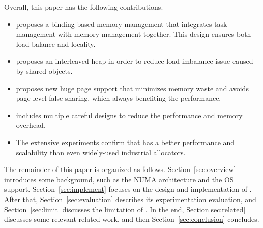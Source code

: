 Overall, this paper has the following contributions. 

\begin{itemize}
\item \NM{} proposes a binding-based memory management that integrates task management with memory management together. This design ensures both load balance and locality.  
\item \NM{} proposes an interleaved heap in order to reduce load imbalance issue caused by shared objects. 
\item \NM{} proposes new huge page support that  minimizes memory waste and avoids page-level false sharing, which always benefiting the performance. 
\item \NM{} includes multiple careful designs to reduce the performance and memory overhead. 
\item The extensive experiments confirm that \NM{} has a better performance and scalability than even widely-used industrial allocators. 
\end{itemize}

The remainder of this paper is organized as follows. Section~\ref{sec:overview} introduces some background, such as the NUMA architecture and the OS support. Section~\ref{sec:implement} focuses on the design and implementation of \NM{}. After that, Section~\ref{sec:evaluation} describes its experimentation evaluation, and Section~\ref{sec:limit} discusses the limitation of \NM{}. In the end, Section\ref{sec:related} discusses some relevant related work, and then Section~\ref{sec:conclusion} concludes. 

